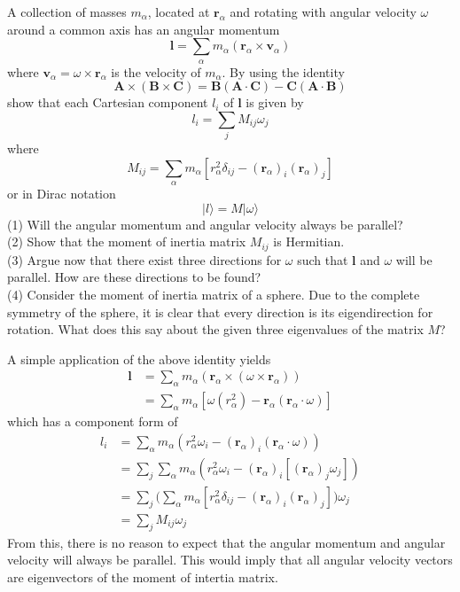 \documentclass[../principles-of-quantum-mechanics.tex]{subfiles}
\begin{document}
\begin{questions}
\question A collection of masses $m_\alpha$, located at $\mathbf{r}_\alpha$ and rotating with angular velocity $\omega$ around a common axis has an angular momentum
\[
	\mathbf{l} = \sum_{\alpha}m_\alpha(\mathbf{r}_\alpha\times\mathbf{v}_\alpha)
\]
where $\mathbf{v}_\alpha=\omega\times\mathbf{r}_\alpha$ is the velocity of $m_\alpha$. By using the identity
\[
\mathbf{A}\times(\mathbf{B}\times\mathbf{C}) = \mathbf{B}(\mathbf{A}\cdot\mathbf{C}) - \mathbf{C}(\mathbf{A}\cdot\mathbf{B})
\]
show that each Cartesian component $l_i$ of $\mathbf{l}$ is given by
\[
	l_i = \sum_j M_{ij}\omega_j
\]
where
\[
	M_{ij} = \sum_\alpha m_\alpha[r_\alpha^2\delta_{ij} - (\mathbf{r}_\alpha)_i(\mathbf{r}_\alpha)_j]
\]
or in Dirac notation
\[
	|l\rangle = M|\omega\rangle
\]
(1) Will the angular momentum and angular velocity always be parallel? \\
(2) Show that the moment of inertia matrix $M_{ij}$ is Hermitian. \\
(3) Argue now that there exist three directions for $\omega$ such that $\mathbf{l}$ and $\omega$ will be parallel. How are these directions to be found? \\
(4) Consider the moment of inertia matrix of a sphere. Due to the complete symmetry of the sphere, it is clear that every direction is its eigendirection for rotation. What does this say about the given three eigenvalues of the matrix $M$?

\begin{solution}
	A simple application of the above identity yields
	\begin{align*}
		\mathbf{l} &= \sum_\alpha m_\alpha(\mathbf{r}_\alpha \times (\omega \times \mathbf{r}_\alpha)) \\
		&= \sum_\alpha m_\alpha[\omega(r_\alpha^2) - \mathbf{r}_\alpha(\mathbf{r}_\alpha\cdot\omega)]
	\end{align*}
	which has a component form of
	\begin{align*}
		l_i &= \sum_\alpha m_\alpha(r_\alpha^2\omega_i - (\mathbf{r}_\alpha)_i(\mathbf{r}_\alpha\cdot\omega)) \\
		&= \sum_j\sum_\alpha m_\alpha(r_\alpha^2\omega_i - (\mathbf{r}_\alpha)_i[(\mathbf{r}_\alpha)_j\omega_j]) \\
		&= \sum_j\Big(\sum_\alpha m_\alpha[r_\alpha^2\delta_{ij} - (\mathbf{r}_\alpha)_i(\mathbf{r}_\alpha)_j] \Big)\omega_j \\
		&= \sum_j M_{ij}\omega_j
	\end{align*}
	From this, there is no reason to expect that the angular momentum and angular velocity will always be parallel. This would imply that all angular velocity vectors are eigenvectors of the moment of intertia matrix.
	

\end{solution}
\end{questions}
\end{document}
